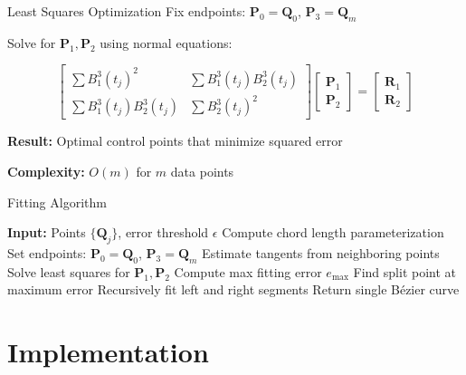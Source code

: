 \documentclass{beamer}
\begin{document}
\begin{frame}{Least Squares Optimization}
Fix endpoints: $\mathbf{P}_0 = \mathbf{Q}_0$, $\mathbf{P}_3 = \mathbf{Q}_m$

Solve for $\mathbf{P}_1, \mathbf{P}_2$ using normal equations:

\begin{equation*}
\begin{bmatrix}
\sum B_1^3(t_j)^2 & \sum B_1^3(t_j)B_2^3(t_j) \\
\sum B_1^3(t_j)B_2^3(t_j) & \sum B_2^3(t_j)^2
\end{bmatrix}
\begin{bmatrix}
\mathbf{P}_1 \\
\mathbf{P}_2
\end{bmatrix}
=
\begin{bmatrix}
\mathbf{R}_1 \\
\mathbf{R}_2
\end{bmatrix}
\end{equation*}

\textbf{Result:} Optimal control points that minimize squared error

\textbf{Complexity:} $O(m)$ for $m$ data points
\end{frame}

\begin{frame}[fragile]{Fitting Algorithm}
\begin{algorithm}[H]
\caption{Adaptive Bézier Curve Fitting}
\begin{algorithmic}[1]
\small
\STATE \textbf{Input:} Points $\{\mathbf{Q}_j\}$, error threshold $\epsilon$
\STATE Compute chord length parameterization
\STATE Set endpoints: $\mathbf{P}_0 = \mathbf{Q}_0$, $\mathbf{P}_3 = \mathbf{Q}_m$
\STATE Estimate tangents from neighboring points
\STATE Solve least squares for $\mathbf{P}_1, \mathbf{P}_2$
\STATE Compute max fitting error $e_{\max}$
    \STATE Find split point at maximum error
    \STATE Recursively fit left and right segments
\ELSE
    \STATE Return single Bézier curve
\ENDIF
\end{algorithmic}
\end{algorithm}
\end{frame}

\section{Implementation}
\end{document}
